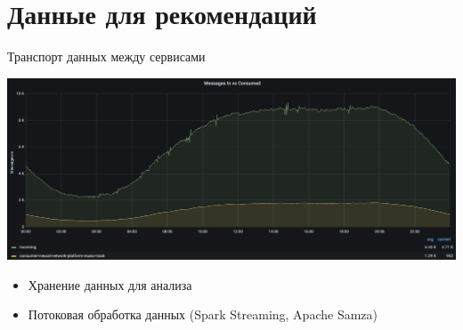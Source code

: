 \documentclass[11pt,aspectratio=169,handout]{beamer}
\newcommand{\vkitem}{\item[\color{vk}$\bullet$]}
\begin{document}
\section{Данные для рекомендаций}

{
\begin{frame}[plain]
\end{frame}
}

\begin{frame}{Транспорт данных между сервисами}

\begin{center}
\includegraphics[scale=0.25]{images/music-activity.png}
\end{center}

\begin{itemize}[<+->]
\vkitem Хранение данных для анализа
\vkitem Потоковая обработка данных (Spark Streaming, Apache Samza)
\end{itemize}

\end{frame}
\end{document}

